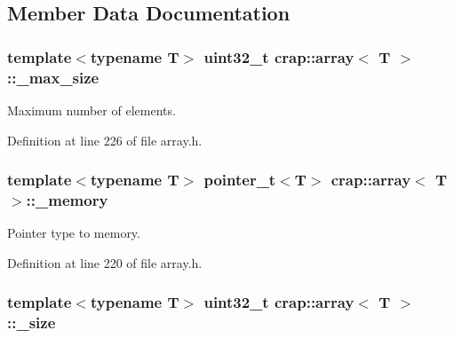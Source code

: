 \subsection{Member Data Documentation}
\hypertarget{classcrap_1_1array_a75c6d374d83be41d0726ae6ca82541fa}{}
\subsubsection[{\+\_\+max\+\_\+size}]{\setlength{\rightskip}{0pt plus 5cm}template$<$typename T$>$ uint32\+\_\+t {\bf crap\+::array}$<$ T $>$\+::\+\_\+max\+\_\+size\hspace{0.3cm}{\ttfamily [protected]}}\label{classcrap_1_1array_a75c6d374d83be41d0726ae6ca82541fa}


Maximum number of elements. 



Definition at line 226 of file array.\+h.

\hypertarget{classcrap_1_1array_a18129c001adcedf3644bf04e5cb6be25}{}
\subsubsection[{\+\_\+memory}]{\setlength{\rightskip}{0pt plus 5cm}template$<$typename T$>$ {\bf pointer\+\_\+t}$<$T$>$ {\bf crap\+::array}$<$ T $>$\+::\+\_\+memory\hspace{0.3cm}{\ttfamily [protected]}}\label{classcrap_1_1array_a18129c001adcedf3644bf04e5cb6be25}


Pointer type to memory. 



Definition at line 220 of file array.\+h.

\hypertarget{classcrap_1_1array_aeebbf4b3828375ad799bb6f3638b5a3f}{}
\subsubsection[{\+\_\+size}]{\setlength{\rightskip}{0pt plus 5cm}template$<$typename T$>$ uint32\+\_\+t {\bf crap\+::array}$<$ T $>$\+::\+\_\+size\hspace{0.3cm}{\ttfamily [protected]}}\label{classcrap_1_1array_aeebbf4b3828375ad799bb6f3638b5a3f}


